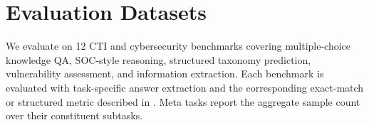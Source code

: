 
\section{Evaluation Datasets}
\label{app:eval-datasets}

We evaluate on 12 CTI and cybersecurity benchmarks covering multiple-choice knowledge QA, SOC-style reasoning, structured taxonomy prediction, vulnerability assessment, and information extraction. Each benchmark is evaluated with task-specific answer extraction and the corresponding exact-match or structured metric described in . Meta tasks report the aggregate sample count over their constituent subtasks.

